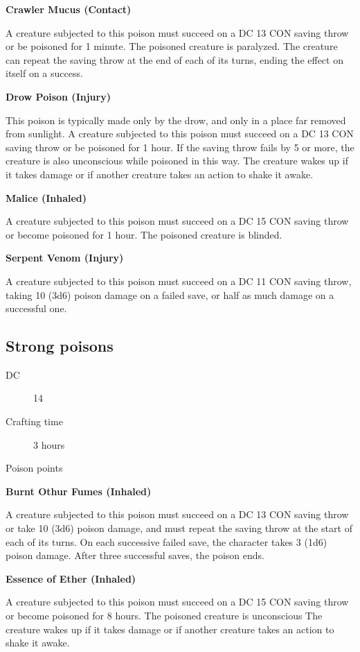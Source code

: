 \textbf{Crawler Mucus (Contact)}

A creature subjected to this poison must succeed on a DC 13 CON saving throw or be poisoned for 1 minute. The poisoned creature is paralyzed. The creature can repeat the saving throw at the end of each of its turns, ending the effect on itself on a success.

\textbf{Drow Poison (Injury)}

This poison is typically made only by the drow, and only in a place far removed from sunlight. A creature subjected to this poison must succeed on a DC 13 CON saving throw or be poisoned for 1 hour. If the saving throw fails by 5 or more, the creature is also unconscious while poisoned in this way. The creature wakes up if it takes damage or if another creature takes an action to shake it awake.

\textbf{Malice (Inhaled)}

A creature subjected to this poison must succeed on a DC 15 CON saving throw or become poisoned for 1 hour. The poisoned creature is blinded.

\textbf{Serpent Venom (Injury)}

A creature subjected to this poison must succeed on a DC 11 CON saving throw, taking 10 (3d6) poison damage on a failed save, or half as much damage on a successful one.

\subsection{Strong poisons}

\begin{description}
\item [DC] 14
\item [Crafting time] 3 hours
\item [Poison points] \poison\poison\poison
\end{description}

\textbf{Burnt Othur Fumes (Inhaled)}

A creature subjected to this poison must succeed on a DC 13 CON saving throw or take 10 (3d6) poison damage, and must repeat the saving throw at the start of each of its turns. On each successive failed save, the character takes 3 (1d6) poison damage. After three successful saves, the poison ends.

\textbf{Essence of Ether (Inhaled)}

A creature subjected to this poison must succeed on a DC 15 CON saving throw or become poisoned for 8 hours. The poisoned creature is unconscious The creature wakes up if it takes damage or if another creature takes an action to shake it awake.

